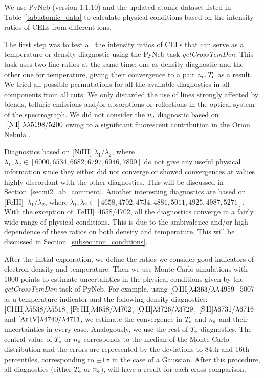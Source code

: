 \documentclass[fleqn,usenatbib]{mnras}
\begin{document}
We use PyNeb (version 1.1.10) \citep{Luridiana15} and the updated atomic dataset listed in Table~\ref{tab:atomic_data} to calculate physical conditions based on the intensity ratios of CELs from different ions. 

The first step was to test all the intensity ratios of CELs that can serve as a temperature or density diagnostic using the PyNeb task {\it getCrossTemDen}. This task uses two line ratios at the same time: one as density diagnostic and the other one for temperature, giving their convergence to a pair $n_{\rm e},\text{}T_{\rm e}$ as a result. We tried all possible permutations for all the available diagnostics in all components from all cuts. We only discarded the use of lines strongly affected by blends, telluric emissions and/or absorptions or reflections in the optical system of the spectrograph. We did not consider the $n_{\rm e}$ diagnostic based on $ \mbox{ [N}\thinspace \mbox{I] }\lambda \lambda 5198/5200$ owing to a significant fluorescent contribution in the Orion Nebula \citep{Ferland12}.  

Diagnostics based on [Ni\thinspace III] $\lambda_1/\lambda_2$, where $\lambda_1, \lambda_2 \in [6000,6534,6682,6797,6946,7890]$ do not give any useful physical information since they either did not converge or showed convergences at values highly discordant with the other diagnostics. This will be discussed in Section~\ref{sec:ni2_ab_comment}.  Another interesting diagnostics are based on \mbox{[Fe}\thinspace \mbox{III] }$\lambda_1/\lambda_2$, where $\lambda_1, \lambda_2 \in [4658,4702,4734,4881,5011,4925,4987,5271]$. With the exception of \mbox{[Fe}\thinspace \mbox{III] }4658/4702, all the diagnostics converge in a fairly wide range of physical conditions. This is due to the ambivalence and/or high dependence of these ratios on both density and temperature. This will be discussed in Section~\ref{subsec:iron_conditions}.

After the initial exploration, we define the ratios we consider good indicators of electron density and temperature. Then we use Monte Carlo simulations with 1000 points to estimate uncertainties in the physical conditions given by the {\it getCrossTemDen} task of PyNeb. For example, using $\mbox{[O}\thinspace \mbox{III]}  \lambda 4363/\lambda \lambda$4959+5007 as a temperature indicator and the following density diagnostics: $\mbox{[Cl}\thinspace \mbox{III]} \lambda5538/\lambda5518$, $\mbox{[Fe}\thinspace \mbox{III]} \lambda4658/\lambda4702$, $\mbox{[O}\thinspace \mbox{II]}\lambda3726/\lambda3729 $, $\mbox{[S}\thinspace \mbox{II]} \lambda6731/\lambda6716 $ and $\mbox{[Ar}\thinspace \mbox{IV]} \lambda4740/\lambda4711$, we estimate the convergence in $T_{\rm e}$ and $n_{\rm e}$ and their uncertainties in every case. Analogously, we use the rest of $T_{\rm e}$-diagnostics. The central value of $T_{\rm e}$ or $n_{\rm e}$ corresponds to the median of the Monte Carlo distribution and the errors are represented by the deviations to 84th and 16th percentiles, corresponding to $\pm 1 \sigma$ in the case of a Gaussian. After this procedure, all diagnostics (either $T_{\rm e}$ or $n_{\rm e}$), will have a result for each cross-comparison. 
\end{document}
